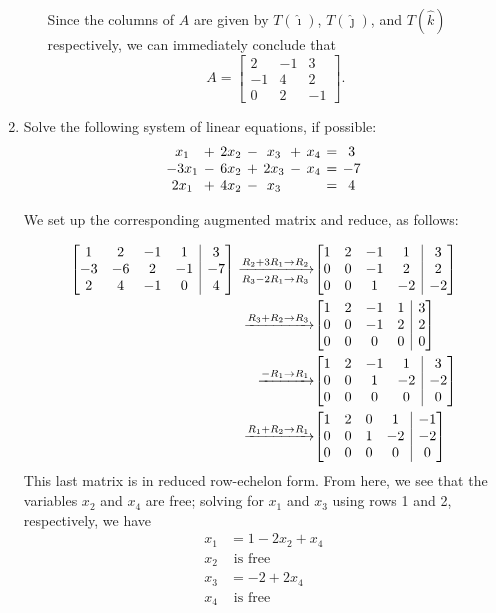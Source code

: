 \documentclass[12pt]{article}
\makeatletter
\newcommand{\points}[1]{\marginpar{\hspace{24pt}[#1]}}
\newcommand{\bbm}{\begin{bmatrix}}
\newcommand{\ebm}{\end{bmatrix}}
\newenvironment{amatrix}[1]{%
  \left[\begin{array}{@{}*{#1}{c}|c@{}}
}{%
  \end{array}\right]
}
\newcommand{\bam}{\begin{amatrix}}
\newcommand{\eam}{\end{amatrix}}
\makeatother
\begin{document}
\begin{enumerate}
\begin{enumerate}
\bigskip

Since the columns of $A$ are given by $T(\hat{\imath})$, $T(\hat{\jmath})$, and $T(\hat{k})$ respectively, we can immediately conclude that
\[
 A = \bbm 2&-1&3\\-1&4&2\\0&2&-1\ebm.
\]

\end{enumerate}

\newpage

\item Solve the following system of linear equations, if possible: \points{6}
\[\arraycolsep=2pt
 \begin{array}{ccccccccc}
  x_1&+&2x_2&-&x_3&+&x_4&=&3\\
 -3x_1&-&6x_2&+&2x_3&-&x_4&=&-7\\
 2x_1&+&4x_2&-&x_3& & &=&4
 \end{array}
\]

\bigskip

We set up the corresponding augmented matrix and reduce, as follows:

\begin{align*}
 \bam{4}1&2&-1&1&3\\-3&-6&2&-1&-7\\2&4&-1&0&4\eam \xrightarrow[R_3-2R_1\to R_3]{R_2+3R_1\to R_2} &\bam{4}1&2&-1&1&3\\0&0&-1&2&2\\0&0&1&-2&-2\eam\\
\xrightarrow{R_3+R_2\to R_3} &\bam{4}1&2&-1&1&3\\0&0&-1&2&2\\0&0&0&0&0\eam\\
\xrightarrow{-R_1\to R_1} &\bam{4}1&2&-1&1&3\\0&0&1&-2&-2\\0&0&0&0&0\eam\\
\xrightarrow{R_1+R_2\to R_1}&\bam{4}1&2&0&1&-1\\0&0&1&-2&-2\\0&0&0&0&0\eam
\end{align*}
This last matrix is in reduced row-echelon form. From here, we see that the variables $x_2$ and $x_4$ are free; solving for $x_1$ and $x_3$ using rows 1 and 2, respectively, we have
\begin{align*}
 x_1&=1-2x_2+x_4\\
 x_2&\text{ is free}\\
 x_3&=-2+2x_4\\
 x_4&\text{ is free}
\end{align*}


\end{enumerate}
\end{document}
